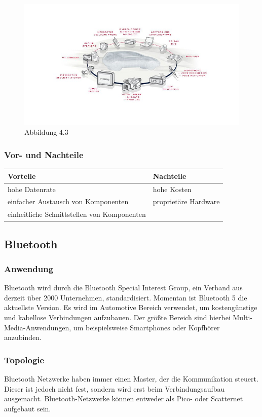     \begin{figure}[h!]
        \includegraphics[width=\linewidth]{most_ring.jpg}
        \caption{Abbildung 4.3 \cite{.MH_Ring}}
    \end{figure}
    
    \subsubsection{Vor- und Nachteile}
    \begin{tabular}{l|l}
        \textbf{Vorteile} & \textbf{Nachteile}\\
        \hline hohe Datenrate & hohe Kosten\\
        \hline einfacher Austausch von Komponenten & proprietäre Hardware\\
        \hline einheitliche Schnittstellen von Komponenten &\\
    \end{tabular}
    
    \subsection{Bluetooth}		
    \subsubsection{Anwendung}
    Bluetooth wird durch die Bluetooth Special Interest Group, ein Verband aus derzeit über 2000 Unternehmen,  standardisiert. Momentan ist Bluetooth 5 die aktuellste Version. Es wird im Automotive Bereich verwendet, um kostengünstige und kabellose Verbindungen aufzubauen. Der größte Bereich sind hierbei Multi-Media-Anwendungen, um beispielsweise Smartphones oder Kopfhörer anzubinden. \cite{BP01}
    
    \subsubsection{Topologie}
    Bluetooth Netzwerke haben immer einen Master, der die Kommunikation steuert. Dieser ist jedoch nicht fest, sondern wird erst beim Verbindungsaufbau ausgemacht.
    Bluetooth-Netzwerke können entweder als Pico- oder Scatternet aufgebaut sein.
                                                                                      
